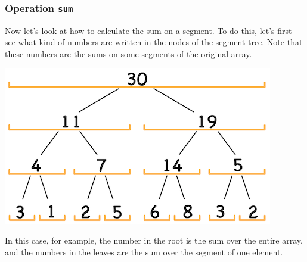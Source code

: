 \documentclass[11pt]{article}
\begin{document}
\subsubsection{Operation \texttt{sum}}
\label{sec:org923d099}
Now let's look at how to calculate the sum on a segment. To do this, let's first see what kind
of numbers are written in the nodes of the segment tree. Note that these numbers are the sums on
some segments of the original array.
\begin{center}
\includegraphics[width=.9\linewidth]{./images/segment-tree-4.png}
\end{center}

In this case, for example, the number in the root is the sum over the entire array, and the
numbers in the leaves are the sum over the segment of one element.
\end{document}

